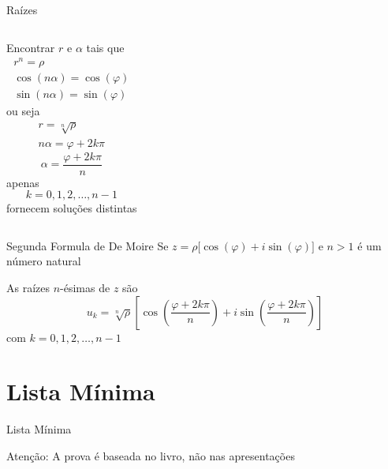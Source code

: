 \begin{frame}{Raízes}
\begin{columns}
  Encontrar $r$ e $\alpha$
  \pause
   tais que
  \begin{gather*}
    r^n = \rho \\
    \cos(n\alpha) = \cos(\varphi) \\
    \sin(n\alpha) = \sin(\varphi)
  \end{gather*}
  \pause
  ou seja
  \begin{gather*}
    r=\sqrt[n]{\rho} \\
    n\alpha = \varphi + 2k\pi
  \end{gather*}
  \pause
  \[
    \alpha = \frac{\varphi + 2k\pi}{n}
  \]
  \pause
  apenas
  \[
    k = 0, 1, 2, \dots, n-1
  \]
  fornecem soluções distintas
\end{columns}
\end{frame}

\begin{frame}{Segunda Formula de De Moire}
  Se
  \(
    z = \rho \big[\cos(\varphi) + i\sin(\varphi)\big]
  \)
  e $n>1$ é um número natural

  \vspace{\baselineskip}
  As raízes $n$-ésimas de $z$ são
  \[
    u_k = \sqrt[n]{\rho}
    \left[
         \cos\left(\frac{\varphi+2k\pi}{n}\right)
      + i\sin\left(\frac{\varphi+2k\pi}{n}\right)
    \right]
  \]
  com \(k=0, 1, 2, \dots, n-1\)
\end{frame}



\section{Lista Mínima}

\begin{frame}{Lista Mínima}

  \vfill
  Atenção: A prova é baseada no livro, não nas apresentações
\end{frame}


